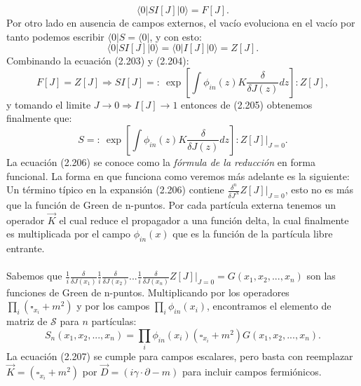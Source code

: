 \begin{equation}
\langle 0|SI[J]|0\rangle=F[J] .
\end{equation}
Por otro lado en ausencia de campos externos, el vacío evoluciona en el vacío por tanto podemos escribir $\langle 0|S=\langle 0|$, y con esto:
\begin{equation}
\langle 0|SI[J]|0\rangle=\langle 0|I[J]|0\rangle=Z[J] .
\end{equation}
Combinando la ecuación (2.203) y (2.204):
\begin{equation}
F[J]=Z[J]\Rightarrow SI[J]=:\ \exp\left[\int\phi_{in}(z)K\frac{\delta}{\delta J(z)}dz\right]:Z[J] ,
\end{equation}
y tomando el limite $J\to 0\Rightarrow I[J]\to 1$ entonces de (2.205) obtenemos finalmente que:
\begin{equation}
S=:\ \exp\left[\int\phi_{in}(z)K\frac{\delta}{\delta J(z)}dz\right]:Z[J]\bigg|_{J=0} .
\end{equation} 
La ecuación (2.206) se conoce como la \textit{fórmula de la reducción} en forma funcional. La forma en que funciona como veremos más adelante es la siguiente: Un término típico en la expansión (2.206) contiene $\frac{\delta^n}{\delta J^N}Z[J]\bigg|_{J=0}$, esto no es más que la función de Green de n-puntos. Por cada partícula externa tenemos un operador $\vec{K}$ el cual reduce el propagador a una función delta, la cual finalmente es multiplicada por el campo $\phi_{in}(x)$ que es la función de la partícula libre entrante.
\\
\\
Sabemos que $\frac{1}{i}\frac{\delta}{\delta J(x_{1})}\frac{1}{i}\frac{\delta}{\delta J(x_{2})}...\frac{1}{i}\frac{\delta}{\delta J(x_{n})}Z[J]\bigg|_{J=0}=G(x_{1},x_{2},...,x_{n})$ son las funciones de Green de n-puntos. Multiplicando por los operadores $\prod_{i}(\square_{x_i}+m^2)$ y por los campos $\prod_{i}\phi_{in}(x_i)$, encontramos el elemento de matriz de $\mathcal{S}$ para $n$ partículas:
\begin{equation}
S_{n}(x_{1},x_{2},...,x_{n})=\prod_{i}\phi_{in}(x_{i})(\square_{x_{i}}+m^{2})G(x_{1},x_{2},...,x_{n}).
\end{equation}
La ecuación (2.207) se cumple para campos escalares, pero basta con reemplazar $\vec{K}=(\square_{x_{i}}+m^{2})$ por $\vec{D}=(i\gamma\cdot\partial-m)$ para incluir campos fermiónicos.

\newpage





